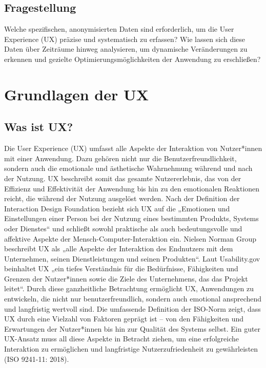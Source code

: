 \documentclass[a4paper,12pt]{report}
\begin{document}
\section{Fragestellung}
	Welche spezifischen, anonymisierten Daten sind erforderlich, um die User Experience (UX) präzise und systematisch zu erfassen? Wie lassen sich diese Daten über Zeiträume hinweg analysieren, um dynamische Veränderungen zu erkennen und gezielte Optimierungsmöglichkeiten der Anwendung zu erschließen?
\chapter{Grundlagen der UX}
\section{Was ist UX?}
Die User Experience (UX) umfasst alle Aspekte der Interaktion von Nutzer*innen mit einer Anwendung. Dazu gehören nicht nur die Benutzerfreundlichkeit, sondern auch die emotionale und ästhetische Wahrnehmung während und nach der Nutzung. UX beschreibt somit das gesamte Nutzererlebnis, das von der Effizienz und Effektivität der Anwendung bis hin zu den emotionalen Reaktionen reicht, die während der Nutzung ausgelöst werden. Nach der Definition der Interaction Design Foundation bezieht sich UX auf die „Emotionen und Einstellungen einer Person bei der Nutzung eines bestimmten Produkts, Systems oder Dienstes“ und schließt sowohl praktische als auch bedeutungsvolle und affektive Aspekte der Mensch-Computer-Interaktion ein. Nielsen Norman Group beschreibt UX als „alle Aspekte der Interaktion des Endnutzers mit dem Unternehmen, seinen Dienstleistungen und seinen Produkten“. Laut Usability.gov beinhaltet UX „ein tiefes Verständnis für die Bedürfnisse, Fähigkeiten und Grenzen der Nutzer*innen sowie die Ziele des Unternehmens, das das Projekt leitet“. Durch diese ganzheitliche Betrachtung ermöglicht UX, Anwendungen zu entwickeln, die nicht nur benutzerfreundlich, sondern auch emotional ansprechend und langfristig wertvoll sind. Die umfassende Definition der ISO-Norm zeigt, dass UX durch eine Vielzahl von Faktoren geprägt ist – von den Fähigkeiten und Erwartungen der Nutzer*innen bis hin zur Qualität des Systems selbst. Ein guter UX-Ansatz muss all diese Aspekte in Betracht ziehen, um eine erfolgreiche Interaktion zu ermöglichen und langfristige Nutzerzufriedenheit zu gewährleisten (ISO 9241-11: 2018).
\end{document}
